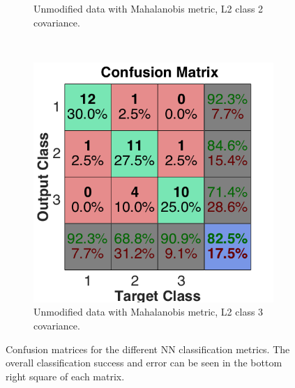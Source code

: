 \documentclass[a4paper, 10pt, conference]{ieeeconf}
\begin{document}
\begin{figure}[!ht]
\begin{subfigure}{0.32\textwidth}
      \caption{Unmodified data with Mahalanobis metric, L2 class 2 covariance.}
    \end{subfigure}
    ~
    \begin{subfigure}{0.32\textwidth}
      \includegraphics[width=\textwidth]{pic/unmod_cov_l2_class3.png}
      \caption{Unmodified data with Mahalanobis metric, L2 class 3 covariance.}
    \end{subfigure}
	\caption{Confusion matrices for the different NN classification metrics. The overall classification success and error can be seen in the bottom right square of each matrix. }
  \label{fig:nnconfuseunmod}
\end{figure}
\newpage
\end{document}

